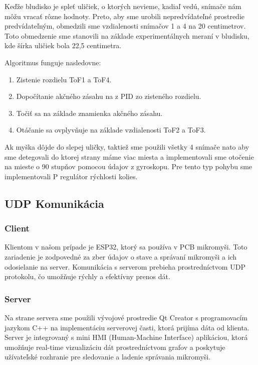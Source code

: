 Keďže bludisko je spleť uličiek, o ktorých nevieme, kadiaľ vedú, snímače nám môžu vracať rôzne hodnoty. Preto, aby sme urobili nepredvídateľné prostredie predvídateľným, obmedzili sme vzdialenosti snímačov 1 a 4 na 20 centimetrov. Toto obmedzenie sme stanovili na základe experimentálnych meraní v bludisku, kde šírka uličiek bola 22,5 centimetra.

Algoritmus funguje nasledovne:
\begin{enumerate}
	\item Zistenie rozdielu ToF1 a ToF4.
	\item Dopočítanie akčného zásahu na z PID zo zisteného rozdielu.
	\item Točiť sa na základe znamienka akčného zásahu.
	\item Otáčanie sa ovplyvňuje na základe vzdialenosti ToF2 a ToF3.
\end{enumerate}

Ak myška dôjde do slepej uličky, taktiež sme použili všetky 4 snímače nato aby sme detegovali do ktorej strany máme viac miesta a implementovali sme otočenie na mieste o 90 stupňov pomocou údajov z gyroskopu. Pre tento typ pohybu sme implementovali P regulátor rýchlosti kolies.
\subsection{UDP Komunikácia}
\subsubsection{Client}
Klientom v našom prípade je ESP32, ktorý sa používa v PCB mikromyši. Toto zariadenie je zodpovedné za zber údajov o stave a správaní mikromyši a ich odosielanie na server. Komunikácia s serverom prebieha prostredníctvom UDP protokolu, čo umožňuje rýchly a efektívny prenos dát.
\subsubsection{Server}
Na strane servera sme použili vývojové prostredie Qt Creator s programovacím jazykom C++ na implementáciu serverovej časti, ktorá prijíma dáta od klienta. Server je integrovaný s mini HMI (Human-Machine Interface) aplikáciou, ktorá umožňuje real-time vizualizáciu dát prostredníctvom grafov a poskytuje užívateľské rozhranie pre sledovanie a ladenie správania mikromyši.

